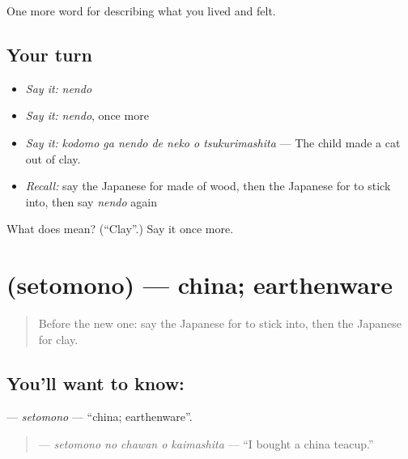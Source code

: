 \begin{grammarlens}[title={What you've built}]
One more word for describing what you lived and felt.
\end{grammarlens}

\subsection*{Your turn}
\begin{itemize}
\raggedright
  \item \emph{Say it:} \emph{nendo}
  \item \emph{Say it:} \emph{nendo}, once more
  \item \emph{Say it:} \emph{kodomo ga nendo de neko o tsukurimashita} — The child made a cat out of clay.
  \item \emph{Recall:} say the Japanese for made of wood, then the Japanese for to stick into, then say \emph{nendo} again
\end{itemize}

\begin{tcolorbox}[breakable,colback=teal!4,colframe=teal!35!black,title={Before you move on}]
What does  mean? (\textquotedblleft{}Clay\textquotedblright{}.) Say it once more.
\end{tcolorbox}
\section[\texorpdfstring{\ja{せともの} (setomono)}{せともの (setomono)}]{ (setomono) — china; earthenware}

\label{lesson:JA-C483-setomono}



\begin{quote}
Before the new one: say the Japanese for to stick into, then the Japanese for clay.
\end{quote}

\subsection*{You'll want to know: }
\textbf{} — \emph{setomono} — \textquotedblleft{}china; earthenware\textquotedblright{}.

\begin{quote}
\textbf{  } — \emph{setomono no chawan o kaimashita} — \textquotedblleft{}I bought a china teacup.\textquotedblright{}
\end{quote}

